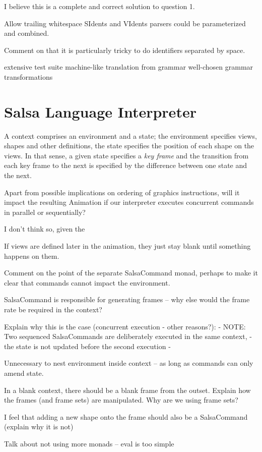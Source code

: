 \documentclass[
paper=a4,
oneside,
fontsize=11pt,
numbers=noenddot,
headinclude=false, %
footinclude=false, %
fleqn,             %
DIV=8
]{scrartcl}
\begin{document}
I believe this is a complete and correct solution to question 1.

Allow trailing whitespace
SIdents and VIdents parsers could be parameterized and combined.

Comment on that it is particularly tricky to do identifiers separated by space.

extensive test suite
machine-like translation from grammar
well-chosen grammar transformations

\section{Salsa Language Interpreter}

A context comprises an environment and a state; the environment specifies views,
shapes and other definitions, the state specifies the position of each shape on
the views. In that sense, a given state specifies a {\em key frame} and the
transition from each key frame to the next is specified by the difference
between one state and the next.

Apart from possible implications on ordering of graphics instructions, will it
impact the resulting Animation if our interpreter executes concurrent commands
in parallel or sequentially?

I don't think so, given the 

If views are defined later in the animation, they just stay blank until
something happens on them.

Comment on the point of the separate SalsaCommand monad, perhaps to make it
clear that commands cannot impact the environment.

SalsaCommand is responsible for generating frames -- why else would the frame
rate be required in the context?

Explain why this is the case (concurrent execution - other reasons?):
{- NOTE: Two sequenced SalsaCommands are deliberately executed in the same context,
 - the state is not updated before the second execution -}

Unnecessary to nest environment inside context -- as long as commands can only
amend state.

In a blank context, there should be a blank frame from the outset. Explain how
the frames (and frame sets) are manipulated.  Why are we using frame sets?

I feel that adding a new shape onto the frame should also be a SalsaCommand
(explain why it is not)

Talk about not using more monads -- eval is too simple
\end{document}
